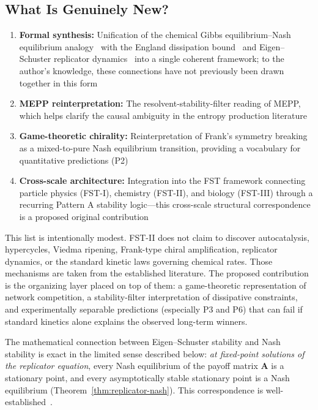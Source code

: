 \documentclass[12pt,a4paper]{article}
\theoremstyle{remark}
\begin{document}
\subsection{What Is Genuinely New?}

\begin{enumerate}
    \item \textbf{Formal synthesis:} Unification of the chemical Gibbs equilibrium--Nash equilibrium analogy~\citep{MetabolicNash} with the England dissipation bound~\citep{England2013} and Eigen--Schuster replicator dynamics~\citep{Eigen1979} into a single coherent framework; to the author's knowledge, these connections have not previously been drawn together in this form
    \item \textbf{MEPP reinterpretation:} The resolvent-stability-filter reading of MEPP, which helps clarify the causal ambiguity in the entropy production literature
    \item \textbf{Game-theoretic chirality:} Reinterpretation of Frank's symmetry breaking~\citep{Frank1953} as a mixed-to-pure Nash equilibrium transition, providing a vocabulary for quantitative predictions (P2)
    \item \textbf{Cross-scale architecture:} Integration into the FST framework connecting particle physics (FST-I), chemistry (FST-II), and biology (FST-III) through a recurring Pattern A stability logic---this cross-scale structural correspondence is a proposed original contribution
\end{enumerate}

This list is intentionally modest. FST-II does not claim to discover autocatalysis, hypercycles, Viedma ripening, Frank-type chiral amplification, replicator dynamics, or the standard kinetic laws governing chemical rates. Those mechanisms are taken from the established literature. The proposed contribution is the organizing layer placed on top of them: a game-theoretic representation of network competition, a stability-filter interpretation of dissipative constraints, and experimentally separable predictions (especially P3 and P6) that can fail if standard kinetics alone explains the observed long-term winners.

The mathematical connection between Eigen--Schuster stability and Nash stability is exact in the limited sense described below: \emph{at fixed-point solutions of the replicator equation}, every Nash equilibrium of the payoff matrix $\mathbf{A}$ is a stationary point, and every asymptotically stable stationary point is a Nash equilibrium (Theorem~\ref{thm:replicator-nash}). This correspondence is well-established~\citep{HofbauerSigmund2003}.
\end{document}
